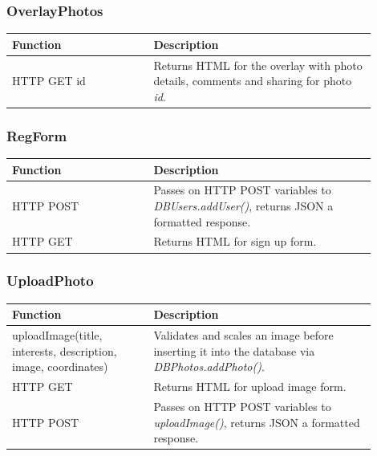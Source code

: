 \subsubsection{OverlayPhotos}
\begin{minipage}{\linewidth}
  \centering
  \setlength{\tabcolsep}{12pt}
  \begin{tabular}{|p{0.35\linewidth}|p{0.55\linewidth}|}
  \hline
  \cellcolor{gray!25} Function & \cellcolor{gray!25} Description \\
  \hline
  HTTP GET id & Returns HTML for the overlay with photo details, comments and sharing for photo \textit{id}. \\
  \hline
  \end{tabular}
\end{minipage}

\subsubsection{RegForm}
\begin{minipage}{\linewidth}
  \centering
  \setlength{\tabcolsep}{12pt}
  \begin{tabular}{|p{0.35\linewidth}|p{0.55\linewidth}|}
  \hline
  \cellcolor{gray!25} Function & \cellcolor{gray!25} Description \\
  \hline
  HTTP POST & Passes on HTTP POST variables to \textit{DBUsers.addUser()}, returns JSON a formatted response. \\
  HTTP GET & Returns HTML for sign up form. \\
  \hline
  \end{tabular}
\end{minipage}

\subsubsection{UploadPhoto}
\begin{minipage}{\linewidth}
  \centering
  \setlength{\tabcolsep}{12pt}
  \begin{tabular}{|p{0.35\linewidth}|p{0.55\linewidth}|}
  \hline
  \cellcolor{gray!25} Function & \cellcolor{gray!25} Description \\
  \hline
  uploadImage(title, interests, description, image, coordinates) & Validates and scales an image before inserting it into the database via \textit{DBPhotos.addPhoto()}. \\
  HTTP GET & Returns HTML for upload image form. \\
  HTTP POST & Passes on HTTP POST variables to \textit{uploadImage()}, returns JSON a formatted response. \\
  \hline
  \end{tabular}
\end{minipage}

